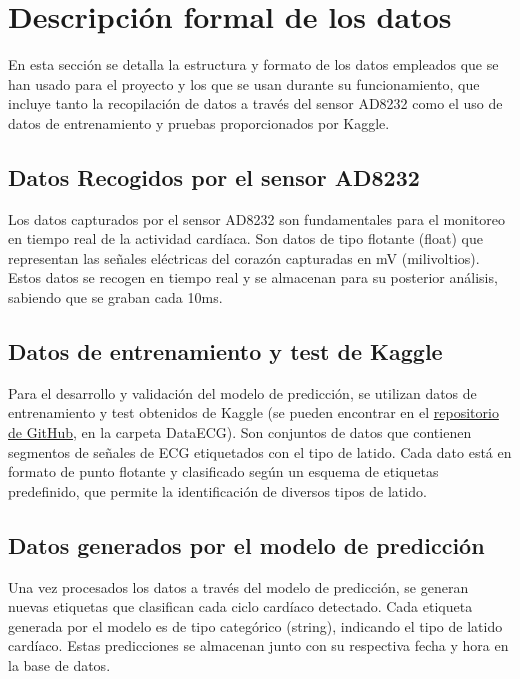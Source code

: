 
\section{Descripción formal de los datos}

En esta sección se detalla la estructura y formato de los datos empleados que se han usado para el proyecto y los que se usan durante su funcionamiento, que incluye tanto la recopilación de datos a través del sensor AD8232 como el uso de datos de entrenamiento y pruebas proporcionados por Kaggle.

\subsection{Datos Recogidos por el sensor AD8232}
Los datos capturados por el sensor AD8232 son fundamentales para el monitoreo en tiempo real de la actividad cardíaca. Son datos de tipo flotante (float) que representan las señales eléctricas del corazón capturadas en mV (milivoltios). Estos datos se recogen en tiempo real y se almacenan para su posterior análisis, sabiendo que se graban cada 10ms.

\subsection{Datos de entrenamiento y test de Kaggle}
Para el desarrollo y validación del modelo de predicción, se utilizan datos de entrenamiento y test obtenidos de Kaggle (se pueden encontrar en el \href{https://github.com/diegotrascasa/TFG_Diego_Trascasa_Garcia}{repositorio de GitHub}, en la carpeta DataECG). Son conjuntos de datos que contienen segmentos de señales de ECG etiquetados con el tipo de latido. Cada dato está en formato de punto flotante y clasificado según un esquema de etiquetas predefinido, que permite la identificación de diversos tipos de latido.

\subsection{Datos generados por el modelo de predicción}
Una vez procesados los datos a través del modelo de predicción, se generan nuevas etiquetas que clasifican cada ciclo cardíaco detectado. Cada etiqueta generada por el modelo es de tipo categórico (string), indicando el tipo de latido cardíaco. Estas predicciones se almacenan junto con su respectiva fecha y hora en la base de datos.


